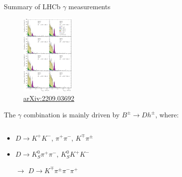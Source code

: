 \documentclass[xcolor={dvipsnames}]{beamer}
\begin{document}
\begin{frame}{Summary of LHCb \texorpdfstring{$\gamma$}{gamma} measurements}
  \begin{figure}
    \includegraphics[height=4cm,trim={0 14.35cm 0 7.07cm},clip=true]{Plots/Fig3_K3pi.pdf}
    \vspace{0.1cm}
    \caption*{\tiny\href{https://arxiv.org/abs/2209.03692}{arXiv:2209.03692}}
  \end{figure}
  \vspace{-0.6cm}
  \begin{center}
    The $\gamma$ combination is mainly driven by $B^\pm\to Dh^\pm$, where:
  \end{center}
  \vspace{-0.2cm}
  \begin{columns}
    \begin{column}{0.5\textwidth}
      \begin{itemize}
        \setlength\itemsep{0.5em}
        \item{$D\to K^+K^-$, $\pi^+\pi^-$, $K^\mp\pi^\pm$}
        \item{$D\to K_S^0\pi^+\pi^-$, $K_S^0K^+K^-$}
        \item[$\rightarrow$]{$D\to K^\mp\pi^\pm\pi^-\pi^+$}
      \end{itemize}
    \end{column}
    \begin{column}{0.5\textwidth}
      \begin{itemize}
        \item[]{}
      \end{itemize}
    \end{column}
  \end{columns}
\end{frame}
\end{document}
